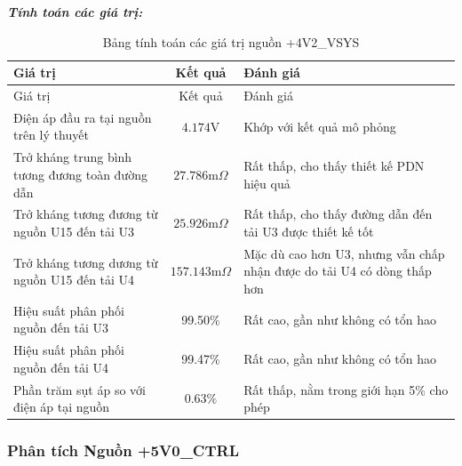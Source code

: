             \textbf{\textit{Tính toán các giá trị:}}
            \begin{longtable}{|p{}|c|p{}|}           
                \caption{Bảng tính toán các giá trị nguồn +4V2\_VSYS}\\
                \hline
                Giá trị & Kết quả & Đánh giá \\
                \hline
                \endfirsthead
                
                \hline
                Giá trị & Kết quả & Đánh giá \\
                \hline
                \endhead
                
                \hline
                \endfoot
                
                \hline
                \endlastfoot
                
                Điện áp đầu ra tại nguồn trên lý thuyết & $4.174\text{V}$ & Khớp với kết quả mô phỏng \\
                Trở kháng trung bình tương đương toàn đường dẫn & $27.786 \text{m}\Omega$ & Rất thấp, cho thấy thiết kế PDN hiệu quả \\
                Trở kháng tương đương từ nguồn U15 đến tải U3 & $25.926 \text{m}\Omega$ & Rất thấp, cho thấy đường dẫn đến tải U3 được thiết kế tốt \\
                Trở kháng tương dương từ nguồn U15 đến tải U4 & $157.143 \text{m}\Omega$ & Mặc dù cao hơn U3, nhưng vẫn chấp nhận được do tải U4 có dòng thấp hơn \\
                Hiệu suất phân phối nguồn đến tải U3 & 99.50\% & Rất cao, gần như không có tổn hao \\
                Hiệu suất phân phối nguồn đến tải U4 & 99.47\% & Rất cao, gần như không có tổn hao \\
                Phần trăm sụt áp so với điện áp tại nguồn & $\mathbf{0.63\%}$ & Rất thấp, nằm trong giới hạn 5\% cho phép
                \label{tab:4v2_vsys_current_density_calculation}\\

                \hline
            \end{longtable}
            
        \newpage
        \subsubsection{Phân tích Nguồn +5V0\_CTRL}
                
